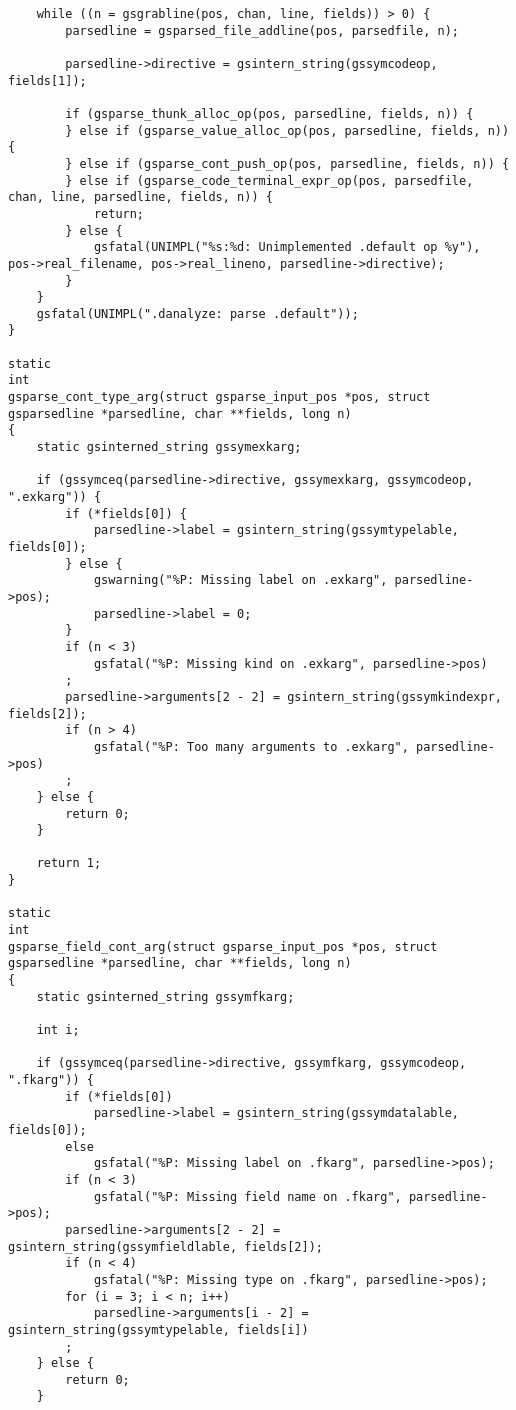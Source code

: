 \documentclass{report}
\begin{document}
\begin{verbatim}
    while ((n = gsgrabline(pos, chan, line, fields)) > 0) {
        parsedline = gsparsed_file_addline(pos, parsedfile, n);

        parsedline->directive = gsintern_string(gssymcodeop, fields[1]);

        if (gsparse_thunk_alloc_op(pos, parsedline, fields, n)) {
        } else if (gsparse_value_alloc_op(pos, parsedline, fields, n)) {
        } else if (gsparse_cont_push_op(pos, parsedline, fields, n)) {
        } else if (gsparse_code_terminal_expr_op(pos, parsedfile, chan, line, parsedline, fields, n)) {
            return;
        } else {
            gsfatal(UNIMPL("%s:%d: Unimplemented .default op %y"), pos->real_filename, pos->real_lineno, parsedline->directive);
        }
    }
    gsfatal(UNIMPL(".danalyze: parse .default"));
}

static
int
gsparse_cont_type_arg(struct gsparse_input_pos *pos, struct gsparsedline *parsedline, char **fields, long n)
{
    static gsinterned_string gssymexkarg;

    if (gssymceq(parsedline->directive, gssymexkarg, gssymcodeop, ".exkarg")) {
        if (*fields[0]) {
            parsedline->label = gsintern_string(gssymtypelable, fields[0]);
        } else {
            gswarning("%P: Missing label on .exkarg", parsedline->pos);
            parsedline->label = 0;
        }
        if (n < 3)
            gsfatal("%P: Missing kind on .exkarg", parsedline->pos)
        ;
        parsedline->arguments[2 - 2] = gsintern_string(gssymkindexpr, fields[2]);
        if (n > 4)
            gsfatal("%P: Too many arguments to .exkarg", parsedline->pos)
        ;
    } else {
        return 0;
    }

    return 1;
}

static
int
gsparse_field_cont_arg(struct gsparse_input_pos *pos, struct gsparsedline *parsedline, char **fields, long n)
{
    static gsinterned_string gssymfkarg;

    int i;

    if (gssymceq(parsedline->directive, gssymfkarg, gssymcodeop, ".fkarg")) {
        if (*fields[0])
            parsedline->label = gsintern_string(gssymdatalable, fields[0]);
        else
            gsfatal("%P: Missing label on .fkarg", parsedline->pos);
        if (n < 3)
            gsfatal("%P: Missing field name on .fkarg", parsedline->pos);
        parsedline->arguments[2 - 2] = gsintern_string(gssymfieldlable, fields[2]);
        if (n < 4)
            gsfatal("%P: Missing type on .fkarg", parsedline->pos);
        for (i = 3; i < n; i++)
            parsedline->arguments[i - 2] = gsintern_string(gssymtypelable, fields[i])
        ;
    } else {
        return 0;
    }


\end{verbatim}
\end{document}
